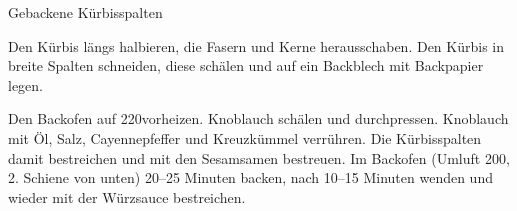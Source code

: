 \begin{recipe}{Gebackene Kürbisspalten}

    \begin{ingredients}
    \end{ingredients}
    
    \begin{instructions}
        Den Kürbis längs halbieren, die Fasern und Kerne herausschaben.
        Den Kürbis in breite Spalten schneiden, diese schälen und auf ein Backblech mit Backpapier legen.

        Den Backofen auf 220\degC vorheizen.
        Knoblauch schälen und durchpressen.
        Knoblauch mit Öl, Salz, Cayennepfeffer und Kreuzkümmel verrühren.
        Die Kürbisspalten damit bestreichen und mit den Sesamsamen bestreuen.
        Im Backofen (Umluft 200\degC, 2. Schiene von unten) 20--25 Minuten backen, nach 10--15 Minuten wenden und wieder mit der Würzsauce bestreichen.
    \end{instructions}
\end{recipe}
